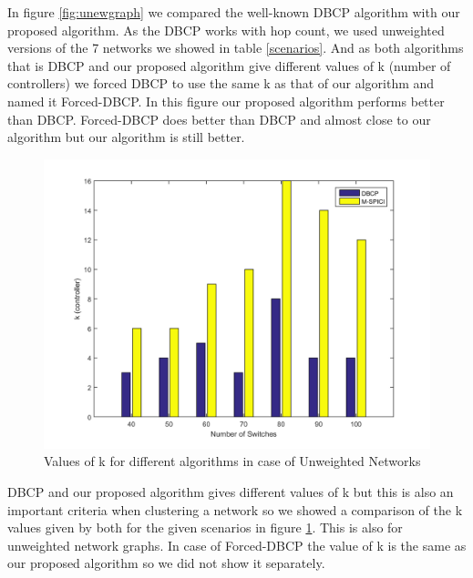 \documentclass[10pt]{extarticle}
\begin{document}
	In figure \ref{fig:unewgraph} we compared the well-known DBCP algorithm with our proposed algorithm. As the DBCP works with hop count, we used unweighted versions of the 7 networks we showed in table \ref{scenarios}. And as both algorithms that is DBCP and our proposed algorithm give different values of k (number of controllers) we forced DBCP to use the same k as that of our algorithm and named it Forced-DBCP. In this figure our proposed algorithm performs better than DBCP. Forced-DBCP does better than DBCP and almost close to our algorithm but our algorithm is still better.
	
	\begin{figure}
		\includegraphics[width=\linewidth]{newbar.png}
		\caption{Values of k for different algorithms in case of Unweighted Networks}
		\label{fig:unewbar}
	\end{figure}

	DBCP and our proposed algorithm gives different values of k but this is also an important criteria when clustering a network so we showed a comparison of the k values given by both for the given scenarios in figure \ref{fig:unewbar}. This is also for unweighted network graphs. In case of Forced-DBCP the value of k is the same as our proposed algorithm so we did not show it separately.
	
\end{document}
